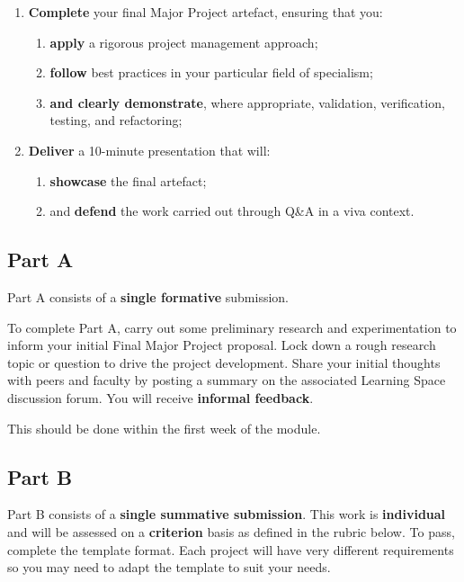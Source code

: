 \begin{enumerate}[label=(\Alph*)]
	\item \textbf{Complete} your final Major Project artefact, ensuring that you:
		\begin{enumerate}[label=(\roman*)]
			\item \textbf{apply} a rigorous project management approach;
			\item \textbf{follow} best practices in your particular field of specialism;
			\item \textbf{and clearly demonstrate}, where appropriate, validation, verification, testing, and refactoring;
		\end{enumerate}

	\item \textbf{Deliver} a 10-minute presentation that will:
		\begin{enumerate}[label=(\roman*)]
			\item \textbf{showcase} the final artefact;
			\item and \textbf{defend} the work carried out through Q\&A in a viva context.
		\end{enumerate}
\end{enumerate}

\subsection*{Part A}

Part A consists of a \textbf{single formative} submission.

To complete Part A, carry out some preliminary research and experimentation to inform your initial Final Major Project proposal. Lock down a rough research topic or question to drive the project development. Share your initial thoughts with peers and faculty by posting a summary on the associated Learning Space discussion forum. You will receive \textbf{informal feedback}.

This should be done within the first week of the module.

\subsection*{Part B}

Part B consists of a \textbf{single summative submission}.
This work is \textbf{individual} and will be assessed on a \textbf{criterion} basis as defined in the rubric below.
To pass, complete the template format. Each project will have very different requirements so you may need to adapt the template to suit your needs.

